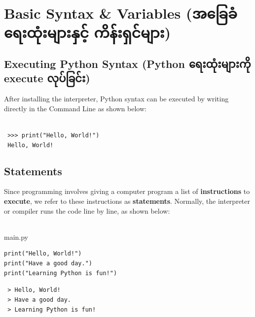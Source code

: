 \documentclass{report}
\begin{document}
\section{Basic Syntax \& Variables ({\burmesefont အခြေခံ ရေးထုံးများနှင့် ကိန်းရှင်များ})}
\subsection{Executing Python Syntax ({\burmesefont Python ရေးထုံးများကို execute လုပ်ခြင်း})}
After installing the interpreter, Python syntax can be executed by writing directly in the Command Line as shown below:
\\\\

\begin{terminal}
\texttt{\color{terminalFont} >>> print("Hello, World!") }\\
\texttt{\color{terminalFont} Hello, World! }\\
\end{terminal}

\subsection{Statements}
Since programming involves giving a computer program a list of \textbf{instructions} to \textbf{execute}, we refer to these instructions as \textbf{statements}. Normally, the interpreter or compiler runs the code line by line, as shown below:
\\\\

\begin{vscode}{main.py}
\begin{lstlisting}[style=vscodeStyle]
print("Hello, World!")
print("Have a good day.")
print("Learning Python is fun!")
\end{lstlisting}
\end{vscode}

\begin{terminal}
\texttt{\color{terminalFont} > Hello, World!}\\
\texttt{\color{terminalFont} > Have a good day.}\\
\texttt{\color{terminalFont} > Learning Python is fun!}\\
\end{terminal}
\end{document}
